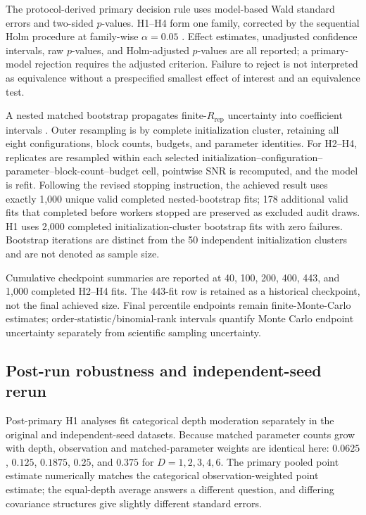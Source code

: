 \documentclass[pdflatex,sn-basic,Numbered]{sn-jnl}
\begin{document}
The protocol-derived primary decision rule uses model-based Wald standard errors and two-sided $p$-values. H1--H4 form one family, corrected by the sequential Holm procedure at family-wise $\alpha=0.05$ \cite{holm1979sequential}. Effect estimates, unadjusted confidence intervals, raw $p$-values, and Holm-adjusted $p$-values are all reported; a primary-model rejection requires the adjusted criterion. Failure to reject is not interpreted as equivalence without a prespecified smallest effect of interest and an equivalence test.

A nested matched bootstrap propagates finite-$R_{\mathrm{rep}}$ uncertainty into coefficient intervals \cite{davison1997bootstrap}. Outer resampling is by complete initialization cluster, retaining all eight configurations, block counts, budgets, and parameter identities. For H2--H4, replicates are resampled within each selected initialization--configuration--parameter--block-count--budget cell, pointwise SNR is recomputed, and the model is refit. Following the revised stopping instruction, the achieved result uses exactly 1,000 unique valid completed nested-bootstrap fits; 178 additional valid fits that completed before workers stopped are preserved as excluded audit draws. H1 uses 2,000 completed initialization-cluster bootstrap fits with zero failures. Bootstrap iterations are distinct from the 50 independent initialization clusters and are not denoted as sample size.

Cumulative checkpoint summaries are reported at 40, 100, 200, 400, 443, and 1,000 completed H2--H4 fits. The 443-fit row is retained as a historical checkpoint, not the final achieved size. Final percentile endpoints remain finite-Monte-Carlo estimates; order-statistic/binomial-rank intervals quantify Monte Carlo endpoint uncertainty separately from scientific sampling uncertainty.


\subsection{Post-run robustness and independent-seed rerun}\label{sec:h2-depth-methods}

Post-primary H1 analyses fit categorical depth moderation separately in the original and independent-seed datasets. Because matched parameter counts grow with depth, observation and matched-parameter weights are identical here: $0.0625$, $0.125$, $0.1875$, $0.25$, and $0.375$ for $D=1,2,3,4,6$. The primary pooled point estimate numerically matches the categorical observation-weighted point estimate; the equal-depth average answers a different question, and differing covariance structures give slightly different standard errors.
\end{document}
